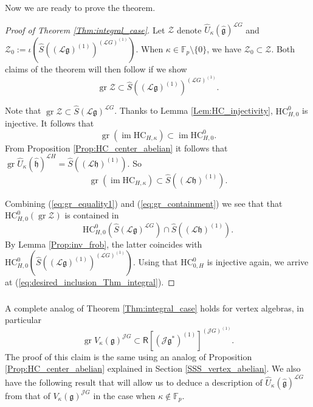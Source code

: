 \documentclass{amsart}
\theoremstyle{definition}
\newcommand{\sss}{\subsubsection{}}
\newcommand{\Ring}{\mathsf{R}}
\newcommand{\g}{\mathfrak{g}}
\newcommand{\hg}{\hat{\mathfrak{g}}}
\newcommand{\gr}{\operatorname{gr}}
\newcommand{\h}{\mathfrak{h}}
\newcommand{\hh}{\hat{\mathfrak{h}}}
\newcommand{\HC}{\mathrm{HC}} %
\newcommand{\F}{\mathbb{F}}
\newcommand{\im}{\operatorname{im}}
\newcommand{\Jet}{\mathscr{J}}
\newcommand{\Loop}{\mathscr{L}}
\numberwithin{equation}{section}
\begin{document}
\sss Now we are ready to prove the theorem.
\begin{proof}[Proof of Theorem \ref{Thm:integral_case}]
Let $\mathscr{Z}$ denote $\widehat{U}_\kappa(\hg)^{\Loop G}$ and $\mathscr{Z}_0:=\iota(\widehat{S}\left((\Loop \g)^{(1)}\right)^{(\Loop G)^{(1)}})$. When $\kappa\in \F_p\setminus \{0\}$,  we have $\mathscr{Z}_0\subset \mathscr{Z}$. Both claims of the theorem will then follow if we show
\begin{equation}\label{eq:desired_inclusion_Thm_integral}
\gr \mathscr{Z}\subset \widehat{S}((\Loop \g)^{(1)})^{(\Loop G)^{(1)}}.
\end{equation}

Note that $\gr\mathscr{Z}\subset \widehat{S}(\Loop\g)^{\Loop G}$.
Thanks to Lemma \ref{Lem:HC_injectivity}, $\HC^0_{H,0}$ is injective. It follows that 
\begin{equation}\label{eq:gr_equality1}
\gr (\im \HC_{H,\kappa})
\subset \operatorname{im}\HC_{H,0}^0. \end{equation}
From Proposition \ref{Prop:HC_center_abelian} it follows that $\gr \widehat{U}_{\kappa}(\hh)^{\Loop H}=\widehat{S}((\Loop \h)^{(1)})$. So
\begin{equation}\label{eq:gr_containment}
\gr (\im \HC_{H,\kappa})\subset \widehat{S}((\Loop \h)^{(1)}).
\end{equation}

Combining 
 (\ref{eq:gr_equality1}) and  (\ref{eq:gr_containment}) we see that that $\HC_{H,0}^0(\gr \mathscr{Z})$ is contained in $$\HC_{H,0}^0\left(\widehat{S}(\Loop\g)^{\Loop G}\right)\cap \widehat{S}\left((\Loop\h)^{(1)}\right).$$ By Lemma \ref{Prop:inv_frob},
the latter coincides with $\HC_{H,0}^0\left(\widehat{S}((\Loop\g)^{(1)})^{(\Loop G)^{(1)}}\right)$.  Using that $\HC_{0,H}^0$ is injective again, we arrive at (\ref{eq:desired_inclusion_Thm_integral}).  
\end{proof}

\sss\label{SSS_center_vertex_algebra_reduction}
A complete analog of Theorem \ref{Thm:integral_case} holds for vertex algebras, in particular $$\gr V_\kappa(\g)^{\Jet G}\subset \Ring[(\Jet \g^*)^{(1)}]^{(\Jet G)^{(1)}}.$$ The proof of this claim is the same using an analog of Proposition \ref{Prop:HC_center_abelian} explained in Section \ref{SSS_vertex_abelian}. We also have the following result that will allow us to deduce a description of $\widehat{U}_\kappa(\hat{\g})^{\Loop G}$ from that of $V_\kappa(\g)^{\Jet G}$ in the case when $\kappa\not\in \F_p$.
\end{document}
